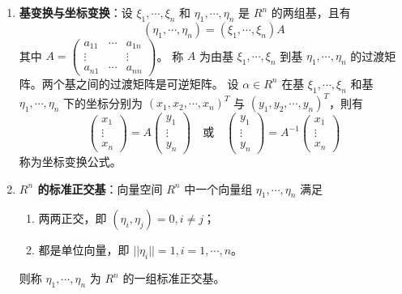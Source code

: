 \documentclass[UTF8]{ctexart}
\theoremstyle{mydef}
\begin{document}
\begin{enumerate}
    \item \textbf{基变换与坐标变换}：设 $\xi_1, \cdots, \xi_n$ 和 $\eta_1, \cdots, \eta_n$ 是 $R^n$ 的两组基，且有
    $$ (\eta_1, \cdots, \eta_n) = (\xi_1, \cdots, \xi_n) A $$
    其中 $A = \begin{pmatrix} a_{11} & \cdots & a_{1n} \\ \vdots & & \vdots \\ a_{n1} & \cdots & a_{nn} \end{pmatrix}$。
    称 $A$ 为由基 $\xi_1, \cdots, \xi_n$ 到基 $\eta_1, \cdots, \eta_n$ 的过渡矩阵。两个基之间的过渡矩阵是可逆矩阵。
    设 $\alpha \in R^n$ 在基 $\xi_1, \cdots, \xi_n$ 和基 $\eta_1, \cdots, \eta_n$ 下的坐标分别为 $(x_1, x_2, \cdots, x_n)^T$ 与 $(y_1, y_2, \cdots, y_n)^T$，則有
    $$ \begin{pmatrix} x_1 \\ \vdots \\ x_n \end{pmatrix} = A \begin{pmatrix} y_1 \\ \vdots \\ y_n \end{pmatrix} \quad \text{或} \quad \begin{pmatrix} y_1 \\ \vdots \\ y_n \end{pmatrix} = A^{-1} \begin{pmatrix} x_1 \\ \vdots \\ x_n \end{pmatrix} $$
    称为坐标变换公式。

    \item \textbf{$R^n$ 的标准正交基}：向量空间 $R^n$ 中一个向量组 $\eta_1, \cdots, \eta_n$ 满足
    \begin{enumerate}
        \item 两两正交，即 $(\eta_i, \eta_j)=0, i \neq j$；
        \item 都是单位向量，即 $||\eta_i||=1, i=1, \cdots, n$。
    \end{enumerate}
    则称 $\eta_1, \cdots, \eta_n$ 为 $R^n$ 的一组标准正交基。


\end{enumerate}
\end{document}
